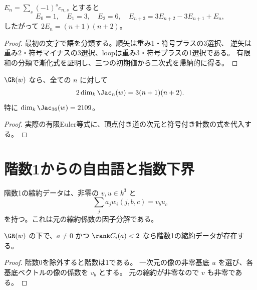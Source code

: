 \begin{lemma}[符号付き計数の漸化式]\label{lem:signed-count}
\leanok
{}
$E_n=\sum_s(-1)^s c_{n,s}$ とすると
\[
 E_0=1,\quad E_1=3,\quad E_2=6,\quad
 E_{n+3}=3E_{n+2}-3E_{n+1}+E_n,
\]
したがって $2E_n=(n+1)(n+2)$。
\end{lemma}
\begin{proof}\leanok
最初の文字で語を分類する。順矢は重み1・符号プラスの3選択、
逆矢は重み2・符号マイナスの3選択、loopは重み3・符号プラスの1選択である。
有限和の分類で漸化式を証明し、三つの初期値から二次式を帰納的に得る。
\end{proof}

\begin{theorem}[Jacobi商の多項式増大]\label{thm:quadratic-growth}
\leanok
{}
$\GR(w)$ なら、全ての $n$ に対して
\[
 2\dim_k\Jac_n(w)=3(n+1)(n+2).
\]
特に $\dim_k\Jac_{36}(w)=2109$。
\end{theorem}
\begin{proof}\leanok
実際の有限Euler等式に、頂点付き道の次元と符号付き計数の式を代入する。
\end{proof}

\section{階数1からの自由語と指数下界}

\begin{definition}[階数1の縮約の因子]\label{def:rank-one}
\leanok
{}
階数1の縮約データは、非零の $v,u\in k^3$ と
\[
 \sum_j a_jw_i(j,b,c)=v_bu_c
\]
を持つ。これは元の縮約係数の因子分解である。
\end{definition}

\begin{lemma}[正則性が破れたときの因子分解]\label{lem:rank-one-factor}
\leanok
{}
$\GR(w)$ の下で、$a\ne0$ かつ $\rank C_i(a)<2$ なら階数1の縮約データが存在する。
\end{lemma}
\begin{proof}\leanok
階数0を除外すると階数は1である。
一次元の像の非零基底 $u$ を選び、各基底ベクトルの像の係数を $v_b$ とする。
元の縮約が非零なので $v$ も非零である。
\end{proof}


